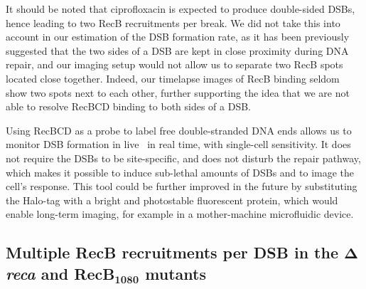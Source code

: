 It should be noted that ciprofloxacin is expected to produce double-sided DSBs, hence leading to two RecB recruitments per break. We did not take this into account in our estimation of the DSB formation rate, as it has been previously suggested that the two sides of a DSB are kept in close proximity during DNA repair\cite{Vickridge2017,Keyamura2019}, and our imaging setup would not allow us to separate two RecB spots located close together. Indeed, our timelapse images of RecB binding seldom show two spots next to each other, further supporting the idea that we are not able to resolve RecBCD binding to both sides of a DSB.

Using RecBCD as a probe to label free double-stranded DNA ends allows us to monitor DSB formation in live \ecoli\ in real time, with single-cell sensitivity. It does not require the DSBs to be site-specific, and does not disturb the repair pathway, which makes it possible to induce sub-lethal amounts of DSBs and to image the cell's response. This tool could be further improved in the future by substituting the Halo-tag with a bright and photostable fluorescent protein, which would enable long-term imaging, for example in a mother-machine microfluidic device.

\subsection*{Multiple RecB recruitments per DSB in the $\mathbf{\Delta}$\emph{reca} and RecB$\mathbf{_{1080}}$ mutants}

